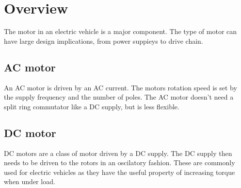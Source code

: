 \documentclass[journal]{IEEEtran}
\begin{document}
\section{Overview}
The motor in an electric vehicle is a major component.
The type of motor can have large design implications, from power suppieys to drive chain.
\subsection{AC motor}
An AC motor is driven by an AC current.
The motors rotation speed is set by the supply frequency and the number of poles.
The AC motor doesn't need a split ring commutator like a DC supply, but is less flexible.
\subsection{DC motor}
DC motors are a class of motor driven by a DC supply.
The DC supply then needs to be driven to the rotors in an oscilatory fashion. 
These are commonly used for electric vehicles as they have the useful property of increasing torque when under load. 
\end{document}

